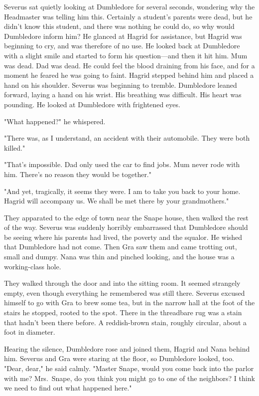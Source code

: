Severus sat quietly looking at Dumbledore for several seconds, wondering why the Headmaster was telling him this. Certainly a student's parents were dead, but he didn't know this student, and there was nothing he could do, so why would Dumbledore inform him? He glanced at Hagrid for assistance, but Hagrid was beginning to cry, and was therefore of no use. He looked back at Dumbledore with a slight smile and started to form his question—and then it hit him. Mum was dead. Dad was dead. He could feel the blood draining from his face, and for a moment he feared he was going to faint. Hagrid stepped behind him and placed a hand on his shoulder. Severus was beginning to tremble. Dumbledore leaned forward, laying a hand on his wrist. His breathing was difficult. His heart was pounding. He looked at Dumbledore with frightened eyes.

"What happened?" he whispered.

"There was, as I understand, an accident with their automobile. They were both killed."

"That's impossible. Dad only used the car to find jobs. Mum never rode with him. There's no reason they would be together."

"And yet, tragically, it seems they were. I am to take you back to your home. Hagrid will accompany us. We shall be met there by your grandmothers."

They apparated to the edge of town near the Snape house, then walked the rest of the way. Severus was suddenly horribly embarrassed that Dumbledore should be seeing where his parents had lived, the poverty and the squalor. He wished that Dumbledore had not come. Then Gra saw them and came trotting out, small and dumpy. Nana was thin and pinched looking, and the house was a working-class hole.

They walked through the door and into the sitting room. It seemed strangely empty, even though everything he remembered was still there. Severus excused himself to go with Gra to brew some tea, but in the narrow hall at the foot of the stairs he stopped, rooted to the spot. There in the threadbare rug was a stain that hadn't been there before. A reddish-brown stain, roughly circular, about a foot in diameter.

Hearing the silence, Dumbledore rose and joined them, Hagrid and Nana behind him. Severus and Gra were staring at the floor, so Dumbledore looked, too. "Dear, dear," he said calmly. "Master Snape, would you come back into the parlor with me? Mrs.~Snape, do you think you might go to one of the neighbors? I think we need to find out what happened here."

